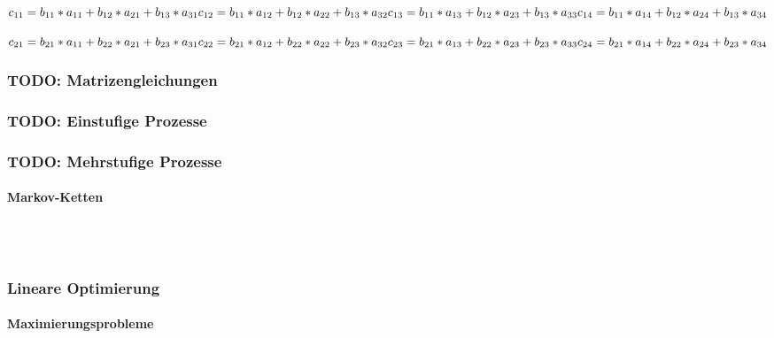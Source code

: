 \documentclass[a4paper]{article} %
\begin{document}
		$\\
		c_{11}=b_{11}*a_{11}+b_{12}*a_{21}+b_{13}*a_{31}\\\\
		c_{12}=b_{11}*a_{12}+b_{12}*a_{22}+b_{13}*a_{32}\\\\
		c_{13}=b_{11}*a_{13}+b_{12}*a_{23}+b_{13}*a_{33}\\\\
		c_{14}=b_{11}*a_{14}+b_{12}*a_{24}+b_{13}*a_{34} 
		$

		$
		\\
		c_{21}=b_{21}*a_{11}+b_{22}*a_{21}+b_{23}*a_{31}\\\\
		c_{22}=b_{21}*a_{12}+b_{22}*a_{22}+b_{23}*a_{32}\\\\
		c_{23}=b_{21}*a_{13}+b_{22}*a_{23}+b_{23}*a_{33}\\\\
		c_{24}=b_{21}*a_{14}+b_{22}*a_{24}+b_{23}*a_{34}
		$



	
	\subsubsection{TODO: Matrizengleichungen}
	

	\subsubsection{TODO: Einstufige Prozesse}
	\subsubsection{TODO: Mehrstufige Prozesse}
	\paragraph{Markov-Ketten}
	\hspace{0 cm} \\ \noindent \\
	\subsubsection{Lineare Optimierung}
	\paragraph{Maximierungsprobleme}
	 \hspace{0 cm} \\ \noindent \\
\end{document}
